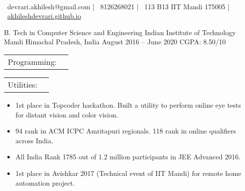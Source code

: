\documentclass[]{awesome-cv}
\begin{document}
    
\begin{center}
	  \\
	\vspace{2mm}
	{\faEnvelope\ devrari.akhilesh@gmail.com} | {\faMobile\ 8126268021} | {\faMapMarker\ 113 B13 IIT Mandi 175005} | {\faLink\ \href{https://akhileshdevrari.github.io/}{akhileshdevrari.github.io}}
\end{center}

\vspace{1mm}
\begin{cventries}
	\cventry
	{B. Tech in Computer Science and Engineering}
	{Indian Institute of Technology Mandi}
	{Himachal Pradesh, India}
	{August 2016 – June 2020}
	{CGPA: 8.50/10}
\end{cventries}


\begin{cventries}
	\vspace{-4mm}
	\cventry
	{}
	{\def\arraystretch{1.15}{\begin{tabular}{ l l }
		Programming:  & {\skill{ Comfortable: C/C++ \hspace{1cm} Familiar: Python, Javascript, Scala, Prolog, C\#, PHP}} \\
		\end{tabular}}}
	{}
	{}
	{}
	
	\vspace{-10mm}
	\cventry
	{}
	{\def\arraystretch{1.15}{\begin{tabular}{ l l }
			Utilities:  & {\skill{ MySQL, Git, Linux shell utilities, HTML/CSS}} \\
		\end{tabular}}}
	{}
	{}
	{}
\end{cventries}

\vspace{-10mm}
\begin{itemize}
	\item 1st place in Topcoder hackathon. Built a utility to perform online eye tests for distant vision and color vision.
	\item 94 rank  in ACM ICPC Amritapuri regionals. 118 rank in online qualifiers across India.
	\item All India Rank 1785  out of 1.2 million participants in JEE Advanced 2016.
	\item 1st place in Avishkar 2017 (Technical event of IIT Mandi) for remote home automation project.
\end{itemize}
\end{document}
